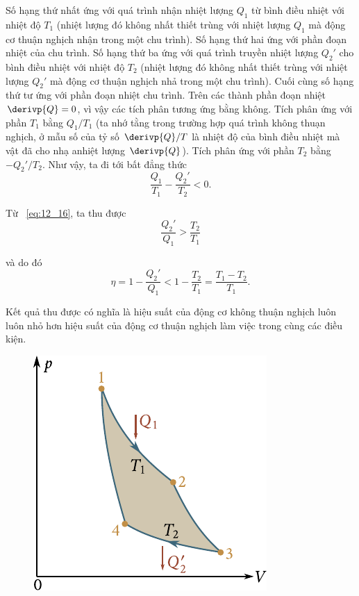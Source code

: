 \noindent
Số hạng thứ nhất ứng với quá trình nhận nhiệt lượng $Q_1$ từ bình điều nhiệt với nhiệt độ $T_1$ (nhiệt lượng đó không nhất thiết trùng với nhiệt lượng $Q_1$ mà động cơ thuận nghịch nhận trong một chu trình). Số hạng thứ hai ứng với phần đoạn nhiệt của chu trình. Số hạng thứ ba ứng với quá trình truyền nhiệt lượng $Q_2'$ cho bình điều nhiệt với nhiệt độ $T_2$ (nhiệt lượng đó không nhất thiết trùng với nhiệt lượng $Q_2'$ mà động cơ thuận nghịch nhả trong một chu trình). Cuối cùng số hạng thứ tư ứng với phần đoạn nhiệt chu trình. Trên các thành phần đoạn nhiệt $\derivp{Q}=0$, vì vậy các tích phân tương ứng bằng không. Tích phân ứng với phần $T_1$ bằng $Q_1/T_1$ (ta nhớ tằng trong trường hợp quá trình không thuạn nghịch, ở mẫu số của tỷ số $\derivp{Q}/T$ là nhiệt độ của bình điều nhiệt mà vật đã cho nhạ anhiệt lượng $\derivp{Q}$). Tích phân ứng với phần $T_2$ bằng $-Q_2'/T_2$. Như vậy, ta đi tới bất đẳng thức
\begin{equation}\label{eq:12_16}
	\frac{Q_1}{T_1} - \frac{Q_2'}{T_2}  < 0.
\end{equation}

\noindent
Từ ~\eqref{eq:12_16}, ta thu được
\begin{equation*}
	\frac{Q_2'}{Q_1} > \frac{T_2}{T_1}
\end{equation*}

\noindent
và do đó
\begin{equation}\label{eq:12_17}
	\eta = 1 - \frac{Q_2'}{Q_1} < 1 - \frac{T_2}{T_1} = \frac{T_1 - T_2}{T_1}.
\end{equation}

\noindent
Kết quả thu được có nghĩa là hiệu suất của động cơ không thuận nghịch luôn luôn nhỏ hơn hiệu suất của động cơ thuận nghịch làm việc trong cùng các điều kiện.

\begin{figure}[!htb]
	\begin{center}
		\includegraphics[scale=1.0]{figures/ch_12/fig_12_4.pdf}
		\caption[]{}
		\label{fig:12_4}
	\end{center}
	\vspace{-0.8cm}
\end{figure}

